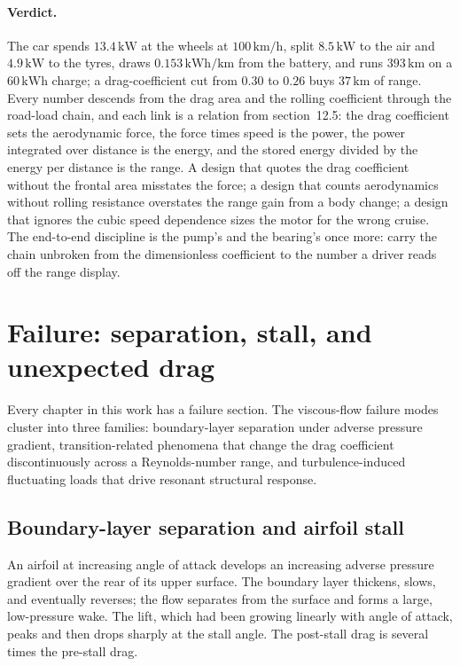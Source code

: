 \paragraph{Verdict.} The car spends $13.4\,\si{\kilo\watt}$ at the
wheels at $100\,\text{km/h}$, split $8.5\,\si{\kilo\watt}$ to the air
and $4.9\,\si{\kilo\watt}$ to the tyres, draws $0.153\,\si{\kilo\watt
\hour\per\kilo\meter}$ from the battery, and runs $393\,\si{\kilo
\meter}$ on a $60\,\si{\kilo\watt\hour}$ charge; a drag-coefficient
cut from $0.30$ to $0.26$ buys $37\,\si{\kilo\meter}$ of range. Every
number descends from the drag area and the rolling coefficient
through the road-load chain, and each link is a relation from
section~12.5: the drag coefficient sets the aerodynamic force, the
force times speed is the power, the power integrated over distance is
the energy, and the stored energy divided by the energy per distance
is the range. A design that quotes the drag coefficient without the
frontal area misstates the force; a design that counts aerodynamics
without rolling resistance overstates the range gain from a body
change; a design that ignores the cubic speed dependence sizes the
motor for the wrong cruise. The end-to-end discipline is the pump's
and the bearing's once more: carry the chain unbroken from the
dimensionless coefficient to the number a driver reads off the range
display.

\section{Failure: separation, stall, and unexpected drag}

Every chapter in this work has a failure section. The viscous-flow
failure modes cluster into three families: boundary-layer
separation under adverse pressure gradient, transition-related
phenomena that change the drag coefficient discontinuously across
a Reynolds-number range, and turbulence-induced fluctuating loads
that drive resonant structural response.

\subsection{Boundary-layer separation and airfoil stall}

An airfoil at increasing angle of attack develops an increasing
adverse pressure gradient over the rear of its upper surface. The
boundary layer thickens, slows, and eventually reverses; the flow
separates from the surface and forms a large, low-pressure wake.
The lift, which had been growing linearly with angle of attack,
peaks and then drops sharply at the stall angle. The post-stall
drag is several times the pre-stall drag.

